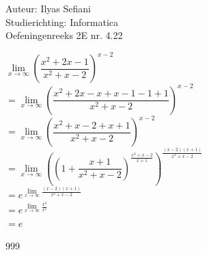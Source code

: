 \documentclass[a4paper]{article}
\begin{document}
\noindent \large Auteur: Ilyas Sefiani \\
\noindent \large Studierichting: Informatica\\
\noindent \large Oefeningenreeks 2E nr. 4.22\\

\medskip

\normalsize

$\lim\limits_{x \rightarrow \infty}\left(\dfrac{x^2+2x-1}{x^2+x-2}\right)^{x-2}$\\

$= \lim\limits_{x \rightarrow \infty}\left(\dfrac{x^2+2x-x+x-1-1+1}{x^2+x-2}\right)^{x-2}$\\

$= \lim\limits_{x \rightarrow \infty}\left(\dfrac{x^2+x-2+x+1}{x^2+x-2}\right)^{x-2}$\\

$= \lim\limits_{x \rightarrow \infty}\left(\left(1+\dfrac{x+1}{x^2+x-2}\right)^{\tfrac{x^2+x-2}{x+1}}\right)^{\tfrac{(x-2)(x+1)}{x^2+x-2}}$\\

$= e^{\lim\limits_{x \rightarrow \infty}\tfrac{(x-2)(x+1)}{x^2+x-2}}$\\

$= e^{\lim\limits_{x \rightarrow \infty}\tfrac{x^2}{x^2}}$\\

$= e$\\

\begin{thebibliography}{999}
\end{thebibliography}
\end{document}
